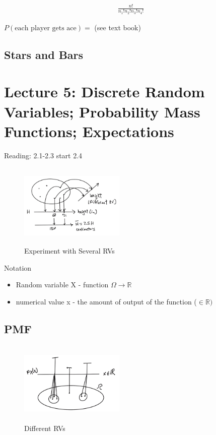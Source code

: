 \documentclass{article}
\begin{document}
\begin{align*}
    \frac{n!}{n_1!n_2!n_3!n_4!}
\end{align*}

$P(\text{each player gets ace}) = $ (see text book)

\subsection{Stars and Bars}


\section{Lecture 5: Discrete Random Variables; Probability Mass Functions; Expectations}

 Reading: 2.1-2.3 start 2.4

\begin{figure}[h]
\centering
\includegraphics[width=5cm, height=4cm]{images/L05/diff_rvs.jpeg}
\caption{Experiment with Several RVs}
\end{figure}

 Notation
\begin{itemize}
    \item Random variable X - function $\Omega \rightarrow \mathbb{R}$
    \item numerical value x - the amount of output of the function ($\in \mathbb{R})$
\end{itemize}

\subsection{PMF}


\begin{figure}[h]
\centering
\includegraphics[width=5cm, height=4cm]{images/L05/pmf_px.jpeg}
\caption{Different RVs}
\end{figure}
\end{document}
